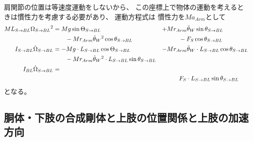 \documentclass[a4paper,11pt]{jsarticle}
\begin{document}
肩関節の位置は等速度運動をしないから、
この座標上で物体の運動を考えるときは慣性力を考慮する必要があり、
運動方程式は
慣性力を$Ma_{Arm}$として
\begin{align}
  ML_{S\rightarrow BL}\Omega_{S\rightarrow BL}{}^2 
  &= Mg\sin\Theta_{S\rightarrow BL} 
  &+& Mr_{Arm}\ddot{\theta}_W\sin\theta_{S\rightarrow BL}
  \notag
  \\
  & \qquad - Mr_{Arm}\dot{\theta}_W{}^2\cos\theta_{S\rightarrow BL} 
  && \qquad -F_S\cos\theta_{S\rightarrow BL}
  \label{eq:PB:L_start}
  \\
  I_{S\rightarrow BL}\dot\Omega_{S\rightarrow BL}{} 
  &= -Mg \cdot L_{S\rightarrow BL}\cos\Theta_{S\rightarrow BL}
  &-& Mr_{Arm}\ddot{\theta}_W \cdot L_{S\rightarrow BL} \cos\theta_{S\rightarrow BL}
  \notag
  \\
  & \qquad - Mr_{Arm}\dot{\theta}_W{}^2 \cdot L_{S\rightarrow BL} \sin\theta_{S\rightarrow BL}
  & &
  \label{eq:PB:I_start}
  \\
  I_{BL}\dot\Omega_{S\rightarrow BL}{} 
  &= 
  & &
  \notag
  \\
  & 
  & & \qquad F_S \cdot L_{S\rightarrow BL} \sin\theta_{S\rightarrow BL}
  \label{eq:PB:IG_start}
\end{align}
となる。

\subsection{胴体・下肢の合成剛体と上肢の位置関係と上肢の加速方向}
\end{document}
